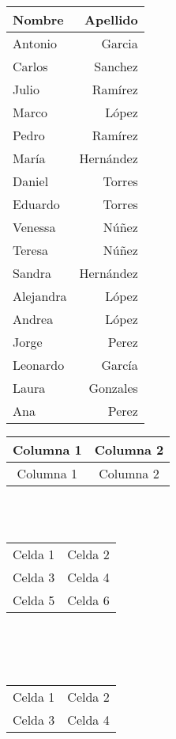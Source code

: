 \documentclass{article}
\begin{document}
\begin{longtable}[c]{l r}
    \toprule
    Nombre & Apellido  \\
     \midrule
    Antonio & Garcia\\ 
    Carlos & Sanchez \\ 
    Julio   &  Ramírez\\
    Marco & López\\
    Pedro &  Ramírez\\
    María & Hernández \\
    Daniel& Torres\\
    Eduardo & Torres\\
    Venessa & Núñez\\
    Teresa& Núñez \\
    Sandra & Hernández \\
    Alejandra & López \\
    Andrea &  López\\
    Jorge & Perez \\
    Leonardo & García \\
    Laura & Gonzales \\
    Ana & Perez \\ \bottomrule
\end{longtable}
\begin{tabular}{|>{\columncolor[RGB]{217,46,111}} c |
    >{\columncolor{micolor}} c|}
    \hline
    Columna 1 & Columna 2 \\
    \hline
    Columna 1  & Columna 2\\
    \hline
\end{tabular}
\\ \\
\begin{tabular}{|l|l|}
    \hline
    \rowcolor[HTML]{D92B37}
    Celda 1 & Celda 2 \\
    \rowcolor[HTML]{84BDDB}
    Celda 3 & Celda 4 \\
    \rowcolor[HTML]{D9D541}
    Celda 5 & Celda 6 \\
\end{tabular}
\\ \\ \\
\begin{tabular}{cc}
    \cellcolor[rgb]{0,0.9,0.7}Celda 1 
    & \cellcolor[HTML]{0CABF2} Celda 2 \\
    \cellcolor[HTML]{0DF1FC} Celda 3 
    & \cellcolor[HTML]{0DFC81} Celda 4 \\
\end{tabular}
\end{document}
